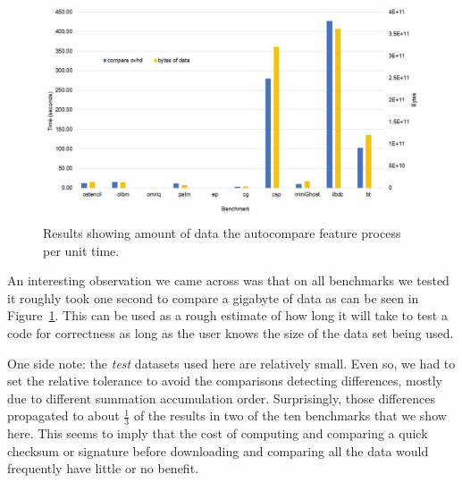 \begin{figure}[ht]
    \centering
    \includegraphics [width=1\linewidth] {GBperSec.pdf}
    \caption{Results showing amount of data the autocompare feature process per unit time.}
    \label{fig:gbps_figure}
\end{figure}


An interesting observation we came across was that on all benchmarks we tested it roughly took one second to compare a gigabyte of data as can be seen in Figure~\ref{fig:gbps_figure}.
This can be used as a rough estimate of how long it will take to test a code for correctness as long as the user knows the size of the data set being used.


One side note: the \emph{test} datasets used here are relatively small.
Even so, we had to set the relative tolerance to avoid the comparisons detecting differences, mostly due to different summation accumulation order.
Surprisingly, those differences propagated to about $\frac{1}{3}$ of the results in two of the ten benchmarks that we show here.
This seems to imply that the cost of computing and comparing a quick checksum or signature before downloading and comparing all the data would frequently have little or no benefit.
